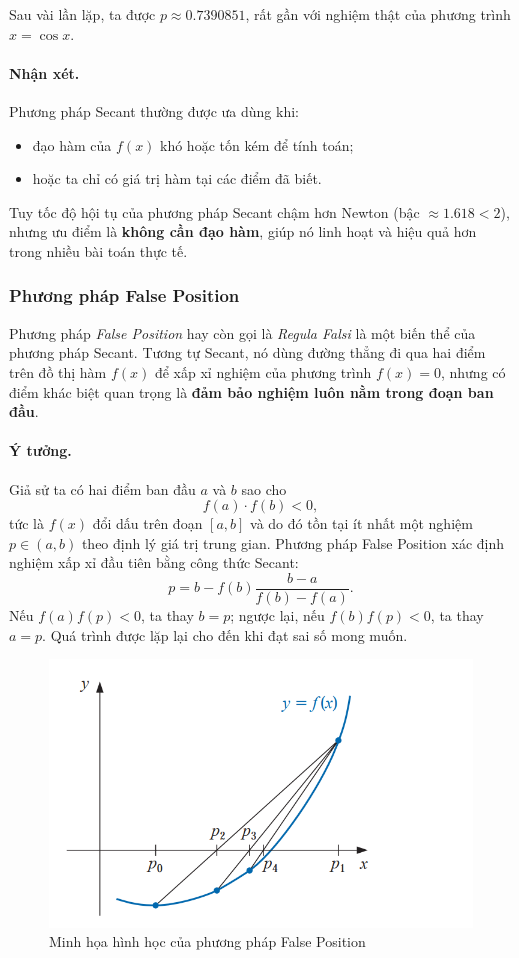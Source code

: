 Sau vài lần lặp, ta được $p \approx 0.7390851$, 
rất gần với nghiệm thật của phương trình $x = \cos x$.

\paragraph*{Nhận xét.}
Phương pháp Secant thường được ưa dùng khi:
\begin{itemize}
    \item đạo hàm của $f(x)$ khó hoặc tốn kém để tính toán;
    \item hoặc ta chỉ có giá trị hàm tại các điểm đã biết.
\end{itemize}
Tuy tốc độ hội tụ của phương pháp Secant chậm hơn Newton (bậc $\approx 1.618 < 2$), nhưng ưu điểm là \textbf{không cần đạo hàm}, giúp nó linh hoạt và hiệu quả hơn trong nhiều bài toán thực tế.

\subsubsection*{Phương pháp False Position}

Phương pháp \textit{False Position} hay còn gọi là \textit{Regula Falsi} 
là một biến thể của phương pháp Secant. 
Tương tự Secant, nó dùng đường thẳng đi qua hai điểm trên đồ thị hàm $f(x)$ 
để xấp xỉ nghiệm của phương trình $f(x) = 0$, 
nhưng có điểm khác biệt quan trọng là \textbf{đảm bảo nghiệm luôn nằm trong đoạn ban đầu}.

\paragraph*{Ý tưởng.}
Giả sử ta có hai điểm ban đầu $a$ và $b$ sao cho
\[
    f(a) \cdot f(b) < 0,
\]
tức là $f(x)$ đổi dấu trên đoạn $[a, b]$ và do đó tồn tại ít nhất một nghiệm $p \in (a, b)$ 
theo định lý giá trị trung gian.  
Phương pháp False Position xác định nghiệm xấp xỉ đầu tiên bằng công thức Secant:
\[
    p = b - f(b)\frac{b - a}{f(b) - f(a)}.
\]
Nếu $f(a)f(p) < 0$, ta thay $b = p$; ngược lại, nếu $f(b)f(p) < 0$, ta thay $a = p$.  
Quá trình được lặp lại cho đến khi đạt sai số mong muốn.

\begin{figure}[H]
    \centering
    \includegraphics[width=1\linewidth]{figures/fasle position.png}
    \caption{Minh họa hình học của phương pháp False Position}
    \label{fig:placeholder}
\end{figure}


